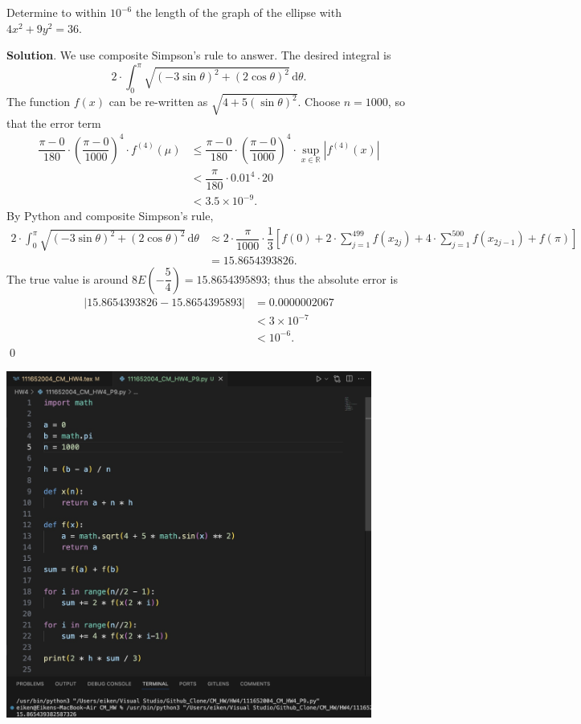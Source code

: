 \documentclass[11pt]{article}
\theoremstyle{break}
\newcommand{\ddi}{\text{$\,$d}}
\numberwithin{equation}{theorem}
\begin{document}
\newpage
\begin{problem}\label{problem 9} %
    Determine to within $10^{-6}$ the length of the graph of the ellipse with $4x^2+9y^2=36$.
\end{problem}
\textbf{Solution}. We use composite Simpson's rule to answer. The desired integral is $$2\cdot\int_{0}^{\pi}\sqrt{\left(-3\sin\theta\right)^2+\left(2\cos\theta\right)^2}\ddi\theta.$$ The function $f(x)$ can be re-written as $\displaystyle\sqrt{4+5(\sin\theta)^2}$. Choose $n=1000$, so that the error term \begin{align*}
    \dfrac{\pi-0}{180}\cdot\left(\dfrac{\pi-0}{1000}\right)^4\cdot f^{(4)}(\mu)&\leq\dfrac{\pi-0}{180}\cdot\left(\dfrac{\pi-0}{1000}\right)^4\cdot \sup_{x\in\mathbb{R}}\left|f^{(4)}(x)\right|\\
    &<\dfrac{\pi}{180}\cdot0.01^4\cdot20\\
    &<3.5\times10^{-9}.
\end{align*} By Python and composite Simpson's rule, \begin{align*}
    2\cdot\int_{0}^{\pi}\sqrt{\left(-3\sin\theta\right)^2+\left(2\cos\theta\right)^2}\ddi\theta&\approx2\cdot\dfrac{\pi}{1000}\cdot\dfrac{1}{3}\left[f(0)+2\cdot\sum_{j=1}^{499}f(x_{2j})+4\cdot\sum_{j=1}^{500}f(x_{2j-1})+f(\pi)\right]\\
    &=15.8654393826.
\end{align*} The true value is around $8E\left(-\dfrac{5}{4}\right)=15.8654395893$; thus the absolute error is \begin{align*}
    \left|15.8654393826-15.8654395893\right|&=0.0000002067\\
    &<3\times10^{-7}\\
    &<10^{-6}.
\end{align*} \qed

\begin{center}
    \includegraphics[width=0.9\textwidth]{P9.jpg}
\end{center}
\end{document}
